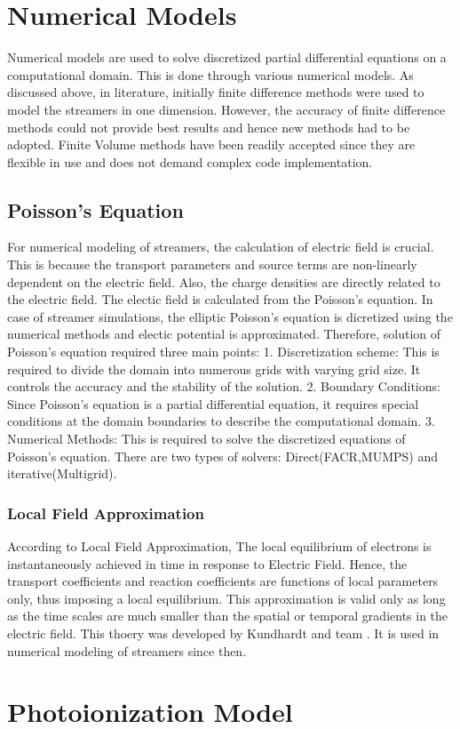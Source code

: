 \chapter{Numerical Models}
      Numerical models are used to solve discretized partial differential equations on a computational domain. This is done through various numerical models. As discussed above, in literature, initially finite difference methods were used to model the streamers in one dimension. However, the accuracy of finite difference methods could not provide best results and hence new methods had to be adopted. Finite Volume methods have been readily accepted since they are flexible in use and does not demand complex code implementation.

\section{Poisson's Equation}

   For numerical modeling of streamers, the calculation of electric field is crucial. This is because the transport parameters and source terms are non-linearly dependent on the electric field. Also, the charge densities are directly related to the electric field. The electic field is calculated from the Poisson's equation. In case of streamer simulations, the elliptic Poisson's equation is dicretized using the numerical methods and electic potential is approximated. Therefore, solution of Poisson's equation required three main points:
   1. Discretization scheme: This is required to divide the domain into numerous grids with varying grid size. It controls the accuracy and the stability of the solution.
   2. Boundary Conditions: Since Poisson's equation is a partial differential equation, it requires special conditions at the domain boundaries to describe the computational domain.
   3. Numerical Methods: This is required to solve the discretized equations of Poisson's equation. There are two types of solvers: Direct(FACR,MUMPS) and iterative(Multigrid). 


\subsection{Local Field Approximation}

According to Local Field Approximation, The local equilibrium of electrons is instantaneously achieved in time in response to Electric Field. Hence, the transport coefficients and reaction coefficients are functions of local parameters only, thus imposing a local equilibrium. This approximation is valid only as long as the time scales are much smaller than the spatial or temporal gradients in the electric field. This thoery was developed by Kundhardt and team \cite{Kunhardt et al 1988}. It is used in numerical modeling of streamers since then.


\chapter{Photoionization Model}




